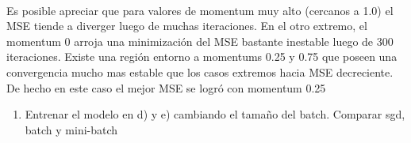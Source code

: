 \documentclass[10pt]{article}
\begin{document}
    \begin{center}
    \end{center}
    { \hspace*{\fill} \\}
    
    Es posible apreciar que para valores de momentum muy alto (cercanos a
1.0) el MSE tiende a diverger luego de muchas iteraciones. En el otro
extremo, el momentum 0 arroja una minimización del MSE bastante
inestable luego de 300 iteraciones. Existe una región entorno a
momentums 0.25 y 0.75 que poseen una convergencia mucho mas estable que
los casos extremos hacia MSE decreciente. De hecho en este caso el mejor
MSE se logró con momentum 0.25

    \begin{enumerate}
\def\labelenumi{\alph{enumi})}
\setcounter{enumi}{9}
\itemsep1pt\parskip0pt
\item
  Entrenar el modelo en d) y e) cambiando el tamaño del batch. Comparar
  sgd, batch y mini-batch
\end{enumerate}
\end{document}
